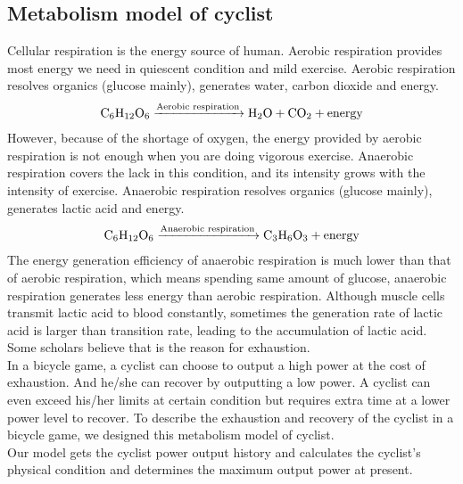 \documentclass{mcmthesis}
\begin{document}
  \subsection{Metabolism model of cyclist}
  Cellular respiration is the energy source of human. Aerobic respiration provides most energy we need in quiescent condition and mild exercise. Aerobic respiration resolves organics (glucose mainly), generates water, carbon dioxide and energy. \\
  \begin{equation*}
    \begin{aligned}
      \ce{C6H12O6 ->[{Aerobic respiration}] H2O + CO2 + \text{energy}}
    \end{aligned}
  \end{equation*}
  However, because of the shortage of oxygen, the energy provided by aerobic respiration is not enough when you are doing vigorous exercise. Anaerobic respiration covers the lack in this condition, and its intensity grows with the intensity of exercise. Anaerobic respiration resolves organics (glucose mainly), generates lactic acid and energy.\\
  \begin{equation*}
    \begin{aligned}
      \ce{C6H12O6 ->[{Anaerobic respiration}] C3H6O3 + \text{energy}}
    \end{aligned}
  \end{equation*}
  The energy generation efficiency of anaerobic respiration is much lower than that of aerobic respiration, which means spending same amount of glucose, anaerobic respiration generates less energy than aerobic respiration. Although muscle cells transmit lactic acid to blood constantly, sometimes the generation rate of lactic acid is larger than transition rate, leading to the accumulation of lactic acid. Some scholars believe that is the reason for exhaustion.\\
  In a bicycle game, a cyclist can choose to output a high power at the cost of exhaustion. And he/she can recover by outputting a low power. A cyclist can even exceed his/her limits at certain condition but requires extra time at a lower power level to recover. To describe the exhaustion and recovery of the cyclist in a bicycle game, we designed this metabolism model of cyclist.\\
  Our model gets the cyclist power output history and calculates the cyclist’s physical condition and determines the maximum output power at present.\\
\end{document}
